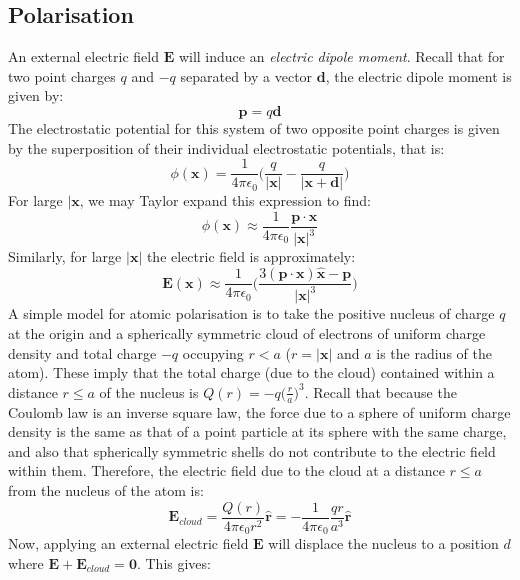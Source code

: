 \documentclass[a4paper]{article}
\numberwithin{equation}{section}
\begin{document}
\subsection{Polarisation}
An external electric field $\mathbf{E}$ will induce an \textit{electric dipole moment}. Recall that for two point charges $q$ and $-q$ separated by a vector $\mathbf{d}$, the electric dipole moment is given by:
\begin{equation}
\mathbf{p}=q\mathbf{d}
\end{equation}
The electrostatic potential for this system of two opposite point charges is given by the superposition of their individual electrostatic potentials, that is:
\begin{equation}
\phi(\mathbf{x})=\frac{1}{4 \pi \epsilon_0}\bigg(\frac{q}{|\mathbf{x}|}-\frac{q}{|\mathbf{x}+\mathbf{d}|} \bigg)
\end{equation}
For large $|\mathbf{x}$, we may Taylor expand this expression to find:
\begin{equation}
\phi(\mathbf{x}) \approx \frac{1}{4 \pi \epsilon_0} \frac{\mathbf{p} \cdot \mathbf{x}}{|\mathbf{x}|^3}
\end{equation}
Similarly, for large $|\mathbf{x}|$ the electric field is approximately:
\begin{equation}
\mathbf{E}(\mathbf{x}) \approx \frac{1}{4\pi \epsilon_0}\bigg(\frac{3(\mathbf{p}\cdot\mathbf{x})\hat{\mathbf{x}}-\mathbf{p}}{|\mathbf{x}|^3} \bigg)
\end{equation}
A simple model for atomic polarisation is to take the positive nucleus of charge $q$ at the origin and a spherically symmetric cloud of electrons of uniform charge density and total charge $-q$ occupying $r<a$ ($r=|\mathbf{x}|$ and $a$ is the radius of the atom). These imply that the total charge (due to the cloud) contained within a distance $r\leq a$ of the nucleus is $Q(r)=-q\big(\frac{r}{a}\big)^3$. Recall that because the Coulomb law is an inverse square law, the force due to a sphere of uniform charge density is the same as that of a point particle at its sphere with the same charge, and also that spherically symmetric shells do not contribute to the electric field within them. Therefore, the electric field due to the cloud at a distance $r\leq a$ from the nucleus of the atom is:
\begin{equation}
\mathbf{E}_{cloud} = \frac{Q(r)}{4\pi \epsilon_0 r^2}\hat{\mathbf{r}} = -\frac{1}{4\pi \epsilon_0} \frac{qr}{a^3}\hat{\mathbf{r}}
\end{equation} 
Now, applying an external electric field $\mathbf{E}$ will displace the nucleus to a position $d$ where $\mathbf{E}+\mathbf{E}_{cloud}=\mathbf{0}$. This gives:
\end{document}
